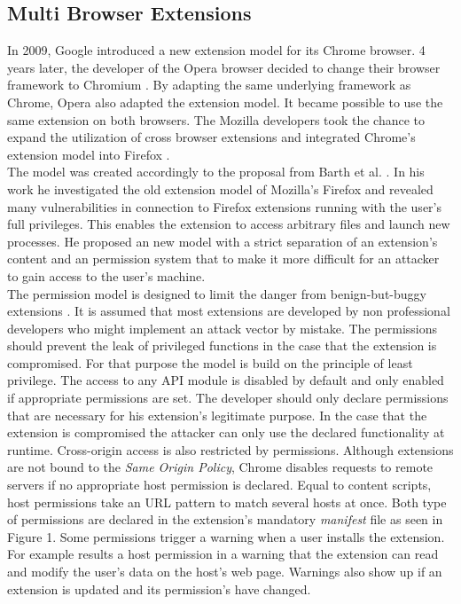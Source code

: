 \documentclass[article,colorback,accentcolor=tud9c,type=bsc]{tudthesis}
\let\stdsubsection\subsection
\renewcommand\subsection{\newpage\stdsubsection}
\begin{document}
\subsection{Multi Browser Extensions}
	
	In 2009, Google introduced a new extension model for its Chrome browser. 4 years later, the developer of the Opera browser decided to change their browser framework to Chromium \cite{operaBlogSwitchToChromium}. By adapting the same underlying framework as Chrome, Opera also adapted the extension model. It became possible to use the same extension on both browsers. The Mozilla developers took the chance to expand the utilization of cross browser extensions and integrated Chrome's extension model into Firefox \cite{mozillaBlogWebExtension}. \\
	The model was created accordingly to the proposal from Barth et al. \cite{Barth10protectingbrowsers}. In his work he investigated the old extension model of Mozilla's Firefox and revealed many vulnerabilities in connection to Firefox extensions running with the user's full privileges. This enables the extension to access arbitrary files and launch new processes. He proposed an new model with a strict separation of an extension's content and an permission system that to make it more difficult for an attacker to gain access to the user's machine. \\ 	
	The permission model is designed to limit the danger from benign-but-buggy extensions \cite{Barth10protectingbrowsers}. It is assumed that most extensions are developed by non professional developers who might implement an attack vector by mistake. The permissions should prevent the leak of privileged functions in the case that the extension is compromised. For that purpose the model is build on the principle of least privilege. The access to any API module is disabled by default and only enabled if appropriate permissions are set. The developer should only declare permissions that are necessary for his extension's legitimate purpose. In the case that the extension is compromised the attacker can only use the declared functionality at runtime. Cross-origin access is also restricted by permissions. Although extensions are not bound to the \textit{Same Origin Policy}, Chrome disables requests to remote servers if no appropriate host permission is declared. Equal to content scripts, host permissions take an URL pattern to match several hosts at once. Both type of permissions are declared in the extension's mandatory \textit{manifest} file as seen in Figure 1. Some permissions trigger a warning when a user installs the extension. For example results a host permission in a warning that the extension can read and modify the user's data on the host's web page. Warnings also show up if an extension is updated and its permission's have changed. \\
	
\end{document}
